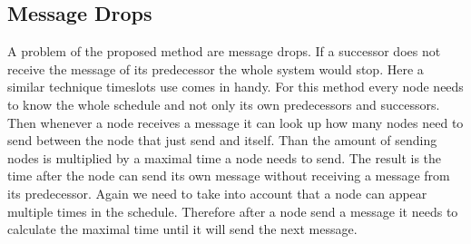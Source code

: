 \subsection{Message Drops}
A problem of the proposed method are message drops. If a successor does not receive the message of its predecessor the whole system would stop. Here a similar technique timeslots use comes in handy. For this method every node needs to know the whole schedule and not only its own predecessors and successors. Then whenever a node receives a message it can look up how many nodes need to send between the node that just send and itself. Than the amount of sending nodes is multiplied by a maximal time a node needs to send. The result is the time after the node can send its own message without receiving a message from its predecessor. Again we need to take into account that a node can appear multiple times in the schedule. Therefore after a node send a message it needs to calculate the maximal time until it will send the next message.
